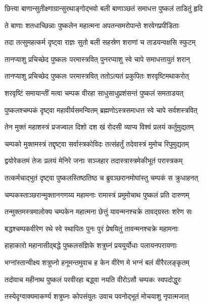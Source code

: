 \twolineshloka
{छित्त्वा बाणान्सुतीक्ष्णाग्रान्सुरथाङ्गोद्भवो बली}
{बाणाञ्छतं समाधत्त पुष्कलं ताडितुं हृदि}%

\twolineshloka
{ते बाणाः शतधाच्छिन्नाः पुष्कलेन महात्मना}
{अपतन्समरोपान्ते शरवेगप्रपीडिताः}%

\twolineshloka
{तदा तत्सुमहत्कर्म दृष्ट्वा राज्ञः सुतो बली}
{सहस्रेण शराणां च ताडयन्वक्षसि स्फुटम्}%

\twolineshloka
{तानप्याशु प्रचिच्छेद पुष्कलः परमास्त्रवित्}
{पुनरप्याशु स्वे चापे समाधत्तायुतं शरान्}%

\twolineshloka
{तानप्याशु प्रचिच्छेद पुष्कलः परमास्त्रवित्}
{ततोऽत्यतं प्रकुपितः शरवृष्टिमथाकरोत्}%

\twolineshloka
{शरवृष्टिं समायान्तीं मत्वा चम्पक वीरहा}
{साधुसाधुप्रशंसन्तं पुष्कलं समताडयत्}%

\twolineshloka
{पुष्कलश्चम्पकं दृष्ट्वा महावीर्यसमन्वितम्}
{ब्रह्मणोऽस्त्रसमाधत्त स्वे चापे सर्वशस्त्रवित्}%

\twolineshloka
{तेन मुक्तं महाशस्त्रं प्रजज्वाल दिशो दश}
{खं रोदसी व्याप्य विश्वं प्रलयं कर्तुमुद्यतम्}%

\twolineshloka
{चम्पको मुक्तमस्त्रं तद्दृष्ट्वा सर्वास्त्रकोविदः}
{तत्संहर्तुं तदेवास्त्रं मुमोच रिपुमुद्यतम्}%

\twolineshloka
{द्वयोरेकतमं तेजः प्रलयं मेनिरे जनाः}
{सञ्जहार तदास्त्रास्त्रमेकीभूतं परास्त्रकम्}%

\twolineshloka
{तत्कर्मचाद्भुतं दृष्ट्वा पुष्कलस्तिष्ठतिष्ठ च}
{ब्रुवञ्छरानमोघांस्तु चम्पकं स क्रुधाहनत्}%

\twolineshloka
{चम्पकस्ताञ्छरान्मुक्तानगणय्य महामनाः}
{रामास्त्रं प्रमुमोचाथ पुष्कलं प्रति दारुणम्}%

\twolineshloka
{तन्मुक्तमस्त्रमालोक्य चम्पकेन महात्मना}
{छेत्तुं यावन्मनश्चक्रे तावद्ग्रस्तः शरेण सः}%

\twolineshloka
{बद्धश्चम्पकवीरेण रथे स्वे स्थापितः पुनः}
{पुरं प्रेषयितुं तावन्मनश्चक्रे महामनाः}%

\twolineshloka
{हाहाकारो महानासीद्बद्धे पुष्कलसंज्ञिके}
{शत्रुघ्नं प्रययुर्योधाः पलायनपरायणाः}%

\twolineshloka
{भग्नांस्तान्वीक्ष्य शत्रुघ्नो हनूमन्तमुवाच ह}
{केन वीरेण मे भग्नं बलं वीरैरलङ्कृतम्}%

\twolineshloka
{तदोवाच महीनाथ पुष्कलं परवीरहा}
{बद्ध्वा नयति वीरोऽसौ चम्पकः स्वपदोद्धुरः}%

\twolineshloka
{तस्येदृग्वाक्यमाकर्ण्य शत्रुघ्नः कोपसंयुतः}
{उवाच पवनोद्भूतं मोचयाशु नृपात्मजात्}%

